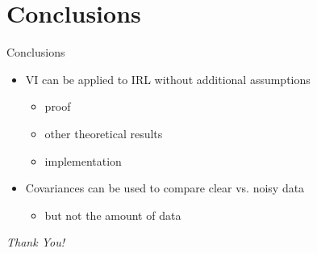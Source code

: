\documentclass{beamer}
\begin{document}
\section{Conclusions}

\begin{frame}{Conclusions}
  \begin{itemize}
  \item VI can be applied to IRL without additional assumptions
    \begin{itemize}
    \item proof
    \item other theoretical results
    \item implementation
    \end{itemize}
  \item Covariances can be used to compare clear vs. noisy data
    \begin{itemize}
    \item but not the amount of data
    \end{itemize}
  \end{itemize}
  \pause
  \vfill
  \centering
  \large
  \emph{Thank You!}
\end{frame}
\end{document}

